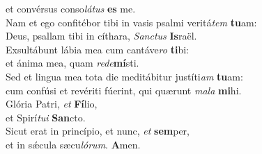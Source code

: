 \oddverse et convérsus conso\textit{lá}\textit{tus} \textbf{es} me.\\
\evenverse Nam et ego confitébor tibi in vasis psalmi veritá\textit{tem} \textbf{tu}am:~\*\\
\evenverse Deus, psallam tibi in cíthara, \textit{San}\textit{ctus} \textbf{Is}raël.\\
\oddverse Exsultábunt lábia mea cum cantáve\textit{ro} \textbf{ti}bi:~\*\\
\oddverse et ánima mea, quam \textit{re}\textit{de}\textbf{mí}sti.\\
\evenverse Sed et lingua mea tota die meditábitur justíti\textit{am} \textbf{tu}am:~\*\\
\evenverse cum confúsi et revériti fúerint, qui quærunt \textit{ma}\textit{la} \textbf{mi}hi.\\
\oddverse Glória Patri, \textit{et} \textbf{Fí}lio,~\*\\
\oddverse et Spirí\textit{tu}\textit{i} \textbf{San}cto.\\
\evenverse Sicut erat in princípio, et nunc, \textit{et} \textbf{sem}per,~\*\\
\evenverse et in sǽcula sæcu\textit{ló}\textit{rum}. \textbf{A}men.\\
